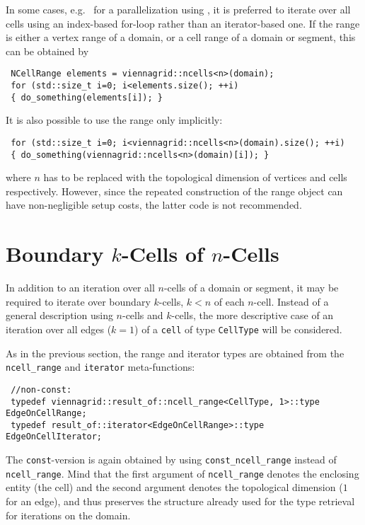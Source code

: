 In some cases, e.g.~ for a parallelization using \OpenMP \cite{openmp}, it is preferred to iterate over all cells using an index-based for-loop rather than an iterator-based one.
If the range is either a vertex range of a domain, or a cell range of a domain or segment, this can be obtained by
\begin{lstlisting}
 NCellRange elements = viennagrid::ncells<n>(domain);
 for (std::size_t i=0; i<elements.size(); ++i)
 { do_something(elements[i]); }
\end{lstlisting}
It is also possible to use the range only implicitly:
\begin{lstlisting}
 for (std::size_t i=0; i<viennagrid::ncells<n>(domain).size(); ++i)
 { do_something(viennagrid::ncells<n>(domain)[i]); }
\end{lstlisting}
where $n$ has to be replaced with the topological dimension of vertices and cells respectively. However, since the repeated construction of the range object can have non-negligible setup costs, the latter code is not recommended.



\section{Boundary $k$-Cells of $n$-Cells}
In addition to an iteration over all $n$-cells of a domain or segment, it may be required to iterate over boundary $k$-cells, $k<n$ of each $n$-cell.
Instead of a general description using $n$-cells and $k$-cells, the more descriptive case of an iteration over all edges ($k=1$) of a \lstinline|cell| of type \lstinline|CellType| will be considered.


As in the previous section, the range and iterator types are obtained from the \lstinline|ncell_range| and \lstinline|iterator| meta-functions:
\begin{lstlisting}
 //non-const:
 typedef viennagrid::result_of::ncell_range<CellType, 1>::type    EdgeOnCellRange;
 typedef result_of::iterator<EdgeOnCellRange>::type    EdgeOnCellIterator;
\end{lstlisting}
The \lstinline|const|-version is again obtained by using \lstinline|const_ncell_range| instead of \lstinline|ncell_range|.
Mind that the first argument of \lstinline|ncell_range| denotes the enclosing entity (the cell) and the second argument denotes the topological dimension ($1$ for an edge), and thus preserves the structure already used for the type retrieval for iterations on the domain.

